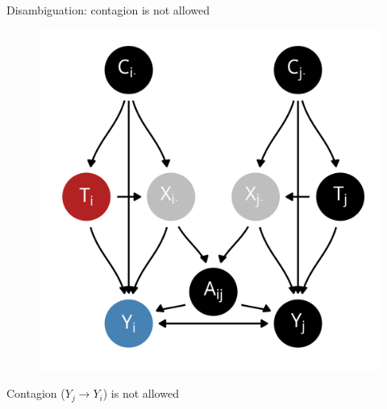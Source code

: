 \documentclass{beamer}
\theoremstyle{remark}
\begin{document}
\appendix

\begin{frame}{Disambiguation: contagion is not allowed}

    \centering

    \begin{figure}
        \includegraphics[scale=0.65]{figures/dags/homophily-mediating-contagion-peer.png}
        \label{fig:contagion}
    \end{figure}

    Contagion ($Y_j \to Y_i$) is not allowed

\end{frame}
\end{document}
